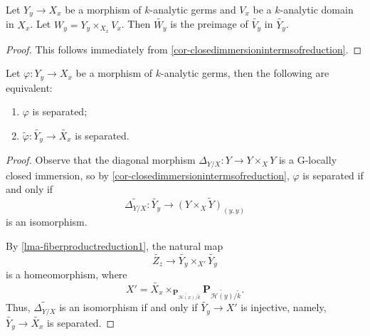 \begin{corollary}\label{cor-analyticdomainfiberproductreduc}
    Let $Y_y\rightarrow X_x$ be a morphism of $k$-analytic germs and $V_x$ be a $k$-analytic domain in $X_x$. Let $W_y=Y_y\times_{X_x}V_x$. Then $\widetilde{W_y}$ is the preimage of $\widetilde{V_y}$ in $\widetilde{Y_y}$.
\end{corollary}
\begin{proof}
    This follows immediately from \cref{cor-closedimmersionintermsofreduction}.
\end{proof}


\begin{corollary}\label{cor-separatednessreductioncri}
    Let $\varphi:Y_y\rightarrow X_x$ be a morphism of $k$-analytic germs, then the following are equivalent:
    \begin{enumerate}
        \item $\varphi$ is separated;
        \item $\tilde{\varphi}:\widetilde{Y_y}\rightarrow \widetilde{X_x}$ is separated.
    \end{enumerate}
\end{corollary}
\begin{proof}
    Observe that the diagonal morphism $\Delta_{Y/X}:Y\rightarrow Y\times_X Y$ is a G-locally closed immersion, so by \cref{cor-closedimmersionintermsofreduction}, $\varphi$ is separated if and only if 
    \[
        \widetilde{\Delta_{Y/X}}: \widetilde{Y_y}\rightarrow \widetilde{(Y\times_X Y)_{(y,y)}} 
    \] 
    is an isomorphism.

    By \cref{lma-fiberproductreduction1}, the natural map
    \[
        \widetilde{Z_z}\rightarrow \widetilde{Y_y}\times_{X'}  \widetilde{Y_y}
    \]
    is a homeomorphism, where 
    \[
        X'=\widetilde{X_x}\times_{\mathbf{P}_{\widetilde{\mathscr{H}(x)}/\tilde{k}}}\mathbf{P}_{\widetilde{\mathscr{H}(y)}/\tilde{k}}.
    \]
    Thus, $\widetilde{\Delta_{Y/X}}$ is an isomorphism if and only if $\widetilde{Y_y}\rightarrow X'$ is injective, namely, $\widetilde{Y_y}\rightarrow \widetilde{X_x}$ is separated.
\end{proof}



